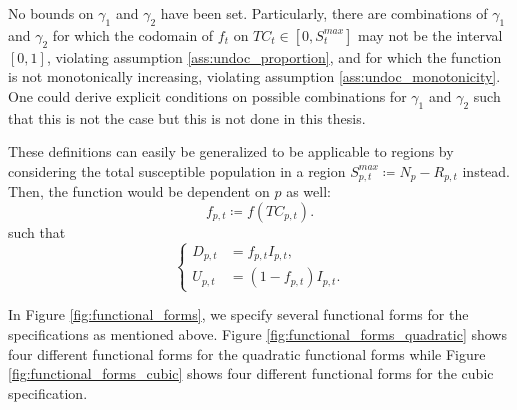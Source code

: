 \documentclass[12pt]{article}
\begin{document}
\begin{itemize}
	    No bounds on $\gamma_1$ and $\gamma_2$ have been set. Particularly, there are combinations of $\gamma_1$ and $\gamma_2$ for which the codomain of $f_t$ on $TC_t \in [0,S^{max}_t]$ may not be the interval $[0,1]$, violating assumption \ref{ass:undoc_proportion}, and for which the function is not monotonically increasing, violating assumption \ref{ass:undoc_monotonicity}. One could derive explicit conditions on possible combinations for $\gamma_1$ and $\gamma_2$ such that this is not the case but this is not done in this thesis.
	\end{itemize}
	
	These definitions can easily be generalized to be applicable to regions by considering the total susceptible population in a region $S^{max}_{p,t} \coloneqq N_p - R_{p,t}$ instead. Then, the function would be dependent on $p$ as well: 
	\begin{equation} \label{eq:f_rt}
	f_{p,t} \coloneqq f(TC_{p,t}).
	\end{equation}
	such that
	\begin{equation*}
	    \begin{cases}
	        D_{p,t} &= f_{p,t} I_{p,t}, \\
	        U_{p,t} &= (1-f_{p,t}) I_{p,t}.
	    \end{cases}
	\end{equation*}
	
	In Figure \ref{fig:functional_forms}, we specify several functional forms for the specifications as mentioned above. Figure \ref{fig:functional_forms_quadratic} shows four different functional forms for the quadratic functional forms while Figure \ref{fig:functional_forms_cubic} shows four different functional forms for the cubic specification.
	
	\def\N{100}
	\def\fmin{0.1}
	
\end{document}

